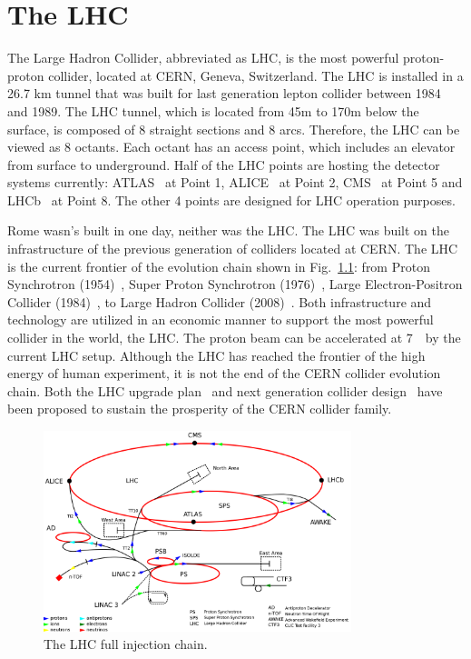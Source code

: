 \chapter{The LHC}
\label{ch:lhc}
\par The Large Hadron Collider, abbreviated as LHC, is the most powerful proton-proton collider, located at CERN, Geneva, Switzerland. The LHC is installed in a 26.7 km tunnel that was built for last generation lepton collider between 1984 and 1989. The LHC tunnel, which is located from 45m to 170m below the surface, is composed of 8 straight sections and 8 arcs. Therefore, the LHC can be viewed as 8 octants. Each octant has an access point, which includes an elevator from surface to underground. Half of the LHC points are hosting the detector systems currently: ATLAS~\cite{Aad:2008zzm} at Point 1, ALICE~\cite{Aamodt:2008zz} at Point 2, CMS~\cite{Chatrchyan:2008aa} at Point 5 and LHCb~\cite{Alves:2008zz} at Point 8. The other 4 points are designed for LHC operation purposes.

\par Rome wasn's built in one day, neither was the LHC. The LHC was built on the infrastructure of the previous generation of colliders located at CERN. The LHC is the current frontier of the evolution chain shown in Fig.~\ref{fig:c3cernaccs}: from Proton Synchrotron (1954)~\cite{Gilardoni:2011za}, Super Proton Synchrotron (1976)~\cite{Doble:2017syb}, Large Electron-Positron Collider (1984)~\cite{LepInjectorStudy:1983aa,LepInjectorStudy:1983ab}, to Large Hadron Collider (2008)~\cite{Bruning:2004ej,Buning:2004wk}. Both infrastructure and technology are utilized in an economic manner to support the most powerful collider in the world, the LHC. The proton beam can be accelerated at 7~\TeV~by the current LHC setup. Although the LHC has reached the frontier of the high energy of human experiment, it is not the end of the CERN collider evolution chain. Both the LHC upgrade plan~\cite{ApollinariG.:2017ojx} and next generation collider design~\cite{Benedikt:2018csr} have been proposed to sustain the prosperity of the CERN collider family.

\begin{figure}[htbp]
    \centering
    \includegraphics[width=0.8\textwidth]{chapters/c3/figures/cern-accelerator-complex.png}
    \caption{The LHC full injection chain.}
    \label{fig:c3cernaccs}
\end{figure}


